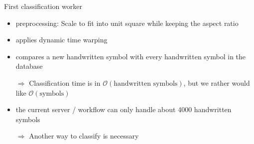 \begin{frame}{First classification worker}
    \begin{itemize}
        \item preprocessing: Scale to fit into unit square while keeping the aspect
              ratio
        \item applies dynamic time warping
        \item compares a new handwritten symbol with every handwritten symbol
              in the database
        \item[$\Rightarrow$] Classification time is in $\mathcal{O}(\text{handwritten symbols})$,
              but we rather would like $\mathcal{O}(\text{symbols})$
        \item the current server / workflow can only handle about 4000 handwritten
              symbols
        \item[$\Rightarrow$] Another way to classify is necessary
    \end{itemize}
\end{frame}